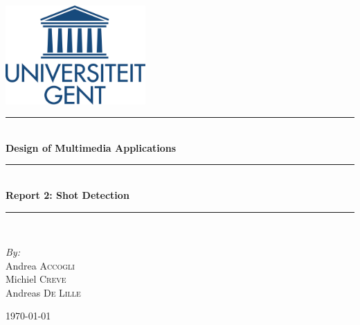 \documentclass[a4paper,11pt]{article}
\newcommand{\HRule}{\rule{\linewidth}{0.5mm}}
\begin{document}
\begin{titlepage}
\begin{center}

\includegraphics[width=0.4\textwidth]{./logo}~\\[1cm]

\HRule \\[0.4cm]
\huge \textbf{Design of Multimedia Applications}
\HRule \\[0.4cm]
{ \huge \bfseries Report 2: Shot Detection \\[0.4cm] }
\HRule \\[0.4cm]

\begin{minipage}{0.4\textwidth}
\begin{flushleft} \large
\emph{By:}\\
Andrea \textsc{Accogli}\\
Michiel \textsc{Creve}\\
Andreas \textsc{De Lille}\\
\end{flushleft}
\end{minipage}

\vfill

{\large \today}

\end{center}
\end{titlepage}

\tableofcontents

\newpage
{}
\setcounter{page}{1}








\clearpage

\end{document}
